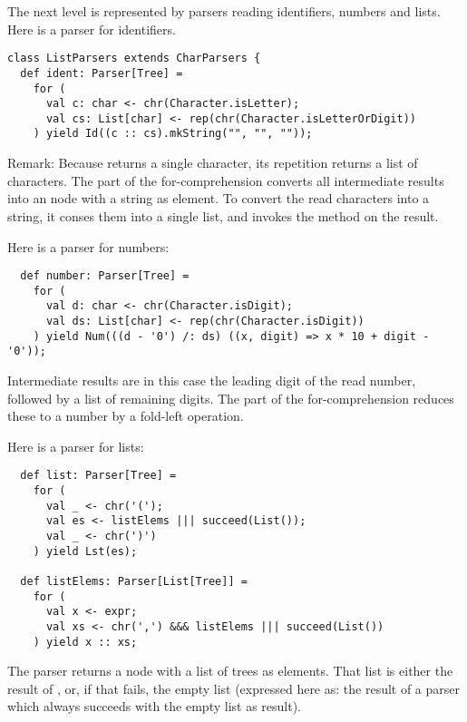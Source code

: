 \documentclass[a4paper,12pt,twoside,titlepage]{book}
\begin{document}
{The next level is represented by parsers reading identifiers, numbers
and lists. Here is a parser for identifiers.
\begin{lstlisting}
class ListParsers extends CharParsers {
  def ident: Parser[Tree] = 
    for (
      val c: char <- chr(Character.isLetter); 
      val cs: List[char] <- rep(chr(Character.isLetterOrDigit))
    ) yield Id((c :: cs).mkString("", "", ""));
\end{lstlisting}
Remark: Because  returns a single character, its
repetition  returns a list of characters. The
 part of the for-comprehension converts all intermediate
results into an  node with a string as element.  To convert
the read characters into a string, it conses them into a single list,
and invokes the  method on the result.

Here is a parser for numbers:
\begin{lstlisting}
  def number: Parser[Tree] =
    for (
      val d: char <- chr(Character.isDigit);
      val ds: List[char] <- rep(chr(Character.isDigit))
    ) yield Num(((d - '0') /: ds) ((x, digit) => x * 10 + digit - '0'));
\end{lstlisting}
Intermediate results are in this case the leading digit of
the read number, followed by a list of remaining digits.  The
 part of the for-comprehension reduces these to a number
by a fold-left operation.

Here is a parser for lists:
\begin{lstlisting}
  def list: Parser[Tree] = 
    for (
      val _ <- chr('(');
      val es <- listElems ||| succeed(List());
      val _ <- chr(')')
    ) yield Lst(es);

  def listElems: Parser[List[Tree]] = 
    for (
      val x <- expr;
      val xs <- chr(',') &&& listElems ||| succeed(List())
    ) yield x :: xs;
\end{lstlisting}
The  parser returns a  node with a list of trees
as elements.  That list is either the result of , or,
if that fails, the empty list (expressed here as: the result of a
parser which always succeeds with the empty list as result).

}
\end{document}
